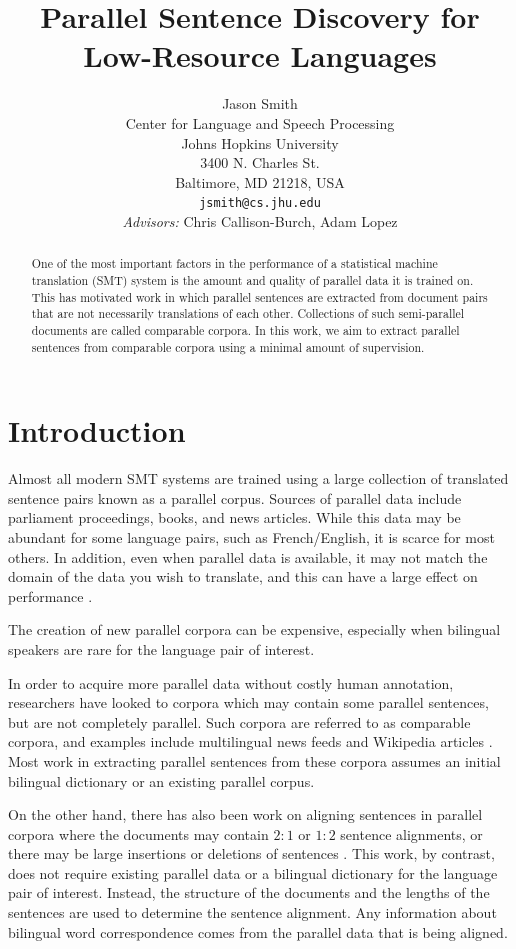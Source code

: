 \documentclass[11pt,letterpaper]{article}
\title{Parallel Sentence Discovery for Low-Resource Languages}
\author{Jason Smith\\
  Center for Language and Speech Processing\\
  Johns Hopkins University\\
  3400 N. Charles St.\\
  Baltimore, MD 21218, USA\\
  {\tt jsmith@cs.jhu.edu}\\
  {\em Advisors:} Chris Callison-Burch, Adam Lopez
}
\newcommand{\Note}[1]{}
\newcommand{\NoteJS}[1]{\Note{#1~--JS}}
\begin{document}
\maketitle
\begin{abstract}
One of the most important factors in the performance of a statistical machine
translation (SMT) system is the amount and quality of parallel data it is
trained on. This has motivated work in which parallel sentences are extracted
from document pairs that are not necessarily translations of each other.
Collections of such semi-parallel documents are called comparable corpora. In
this work, we aim to extract parallel sentences from comparable corpora using a
minimal amount of supervision.
\end{abstract}

\section{Introduction}
Almost all modern SMT systems are trained using a large collection of translated
sentence pairs known as a parallel corpus. Sources of parallel data include
parliament proceedings, books, and news articles.
While this data may be abundant for some language pairs, such as
French/English, it is scarce for most others. In addition, even when parallel
data is available, it may not match the domain of the data you wish to
translate, and this can have a large effect on performance \cite{Munteanu05}.

The creation of new parallel corpora can be expensive, especially when bilingual
speakers are rare for the language pair of interest.
\NoteJS{maybe show numbers for this if available}
In order to acquire more parallel data without costly human annotation,
researchers have looked to corpora which may contain some parallel sentences,
but are not completely parallel. Such corpora are referred to as comparable
corpora, and examples include multilingual news feeds \cite{Munteanu05} and
Wikipedia articles \cite{Adafre06,Smith10}. 
Most work in extracting parallel sentences from
these corpora assumes an initial bilingual dictionary or an existing parallel
corpus.

On the other hand, there has also been work on aligning sentences in parallel
corpora where the documents may contain $2:1$ or $1:2$ sentence alignments, or
there may be large insertions or deletions of sentences \cite{Gale93,Chen93,Moore02}.
This work, by contrast, does not require existing parallel data or a
bilingual dictionary for the language pair of interest. Instead, the structure
of the documents and the lengths of the sentences are used to determine the
sentence alignment. Any information about bilingual word correspondence comes
from the parallel data that is being aligned.
\end{document}
